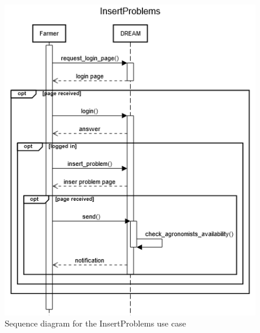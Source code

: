 \documentclass{article}
\begin{document}
\begin{figure}[H]
    \centering
    \includegraphics[scale=0.75]{sequence_diagrams/InsertProblems}
    \caption{Sequence diagram for the InsertProblems use case}
\end{figure}

\end{document}
